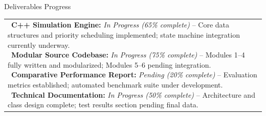 \documentclass[12pt,a4paper]{article}
\newcommand{\sectiontitle}[1]{%
    {\color{GEUBlue}
    \fontsize{16.5}{20}\selectfont #1}
}
\newcommand{\instruction}[1]{%
    {\color{InstructionGrey}
    \fontsize{9.5}{12}\selectfont #1}
}
\newcommand{\answerbox}[2]{%
    \noindent
    \begin{tabularx}{\textwidth}{
        |>{\raggedright\arraybackslash}X|}
        \hline
        \parbox[t][#1][t]{\dimexpr\linewidth-12pt\relax}{
            \vspace{4pt}
            \fontsize{10}{13.5}\selectfont #2
        }\\
        \hline
    \end{tabularx}
}
\begin{document}
\vspace{0.40cm}

\sectiontitle{Deliverables Progress}

\vspace{0.03cm}

\instruction{

}

\vspace{0.15cm}

\answerbox{4.80cm}{\textbullet~\textbf{C++ Simulation Engine:} \textit{In Progress (65\% complete)} -- Core data structures and priority scheduling implemented; state machine integration currently underway.\\[3pt]
\textbullet~\textbf{Modular Source Codebase:} \textit{In Progress (75\% complete)} -- Modules 1--4 fully written and modularized; Modules 5--6 pending integration.\\[3pt]
\textbullet~\textbf{Comparative Performance Report:} \textit{Pending (20\% complete)} -- Evaluation metrics established; automated benchmark suite under development.\\[3pt]
\textbullet~\textbf{Technical Documentation:} \textit{In Progress (50\% complete)} -- Architecture and class design complete; test results section pending final data.}
\end{document}
